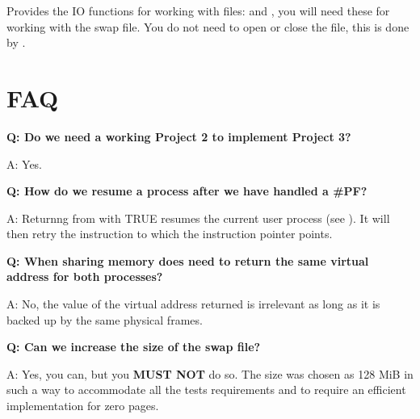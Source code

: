 
Provides the IO functions for working with files:  and , you will
need these for working with the swap file. You do not need to open or close the file, this is done
by \projectname.

\section{FAQ}

\textbf{Q: Do we need a working Project 2 to implement Project 3?}

A: Yes.

\newline

\textbf{Q: How do we resume a process after we have handled a \#PF?}

A: Returnng from  with TRUE resumes the current user process (see
). It will then retry the instruction to which the instruction pointer
points.

\newline

\textbf{Q: When sharing memory does  need to return the same virtual
address for both processes?}

A: No, the value of the virtual address returned is irrelevant as long as it is backed up by the
same physical frames.

\newline

\textbf{Q: Can we increase the size of the swap file?}

A: Yes, you can, but you \textbf{MUST NOT} do so. The size was chosen as 128 MiB in such a way to
accommodate all the tests requirements and to require an efficient implementation for zero pages.

